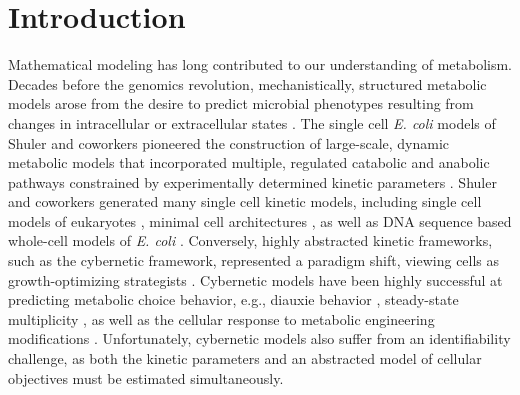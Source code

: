 \documentclass[processes,article,accept,moreauthors,pdftex,12pt,a4paper]{mdpi}
\begin{document}

\section{Introduction}

Mathematical modeling has long contributed to our understanding of metabolism. 
Decades before the genomics revolution, mechanistically, structured metabolic models arose from the desire to predict microbial phenotypes resulting from changes in intracellular or extracellular states \citep{1976_fredrickson_BiotechBioeng}. 
The single cell \textit{E. coli} models of Shuler and coworkers pioneered the construction of large-scale, dynamic metabolic models that incorporated multiple, regulated catabolic and anabolic pathways constrained by experimentally determined kinetic parameters \citep{1984_domach_shuler_BiotechBioeng_01}. 
Shuler and coworkers generated many single cell kinetic models, including single cell models of eukaryotes \citep{1989_steinmeyer_shuler_ChemEngSci,1992_wu_shuler_AnnNYAcadSci}, minimal cell architectures \citep{2004_castellanos_shuler_PNAS}, as well as DNA sequence based whole-cell models of \textit{E. coli} \citep{2008_atlas_shuler_IETSysBio}.
Conversely, highly abstracted kinetic frameworks, such as the cybernetic framework, represented a paradigm shift, viewing cells as growth-optimizing strategists \citep{1985_dhurjati_ramkrishna_tsao_BiotechBioeng}. 
Cybernetic models have been highly successful at predicting metabolic choice behavior, e.g., diauxie behavior \citep{1986_kompala_ramkrishna_tsao_BiotechBioeng}, steady-state multiplicity \citep{2012_kim_ramkrishna_BiotechProg}, as well as the cellular response to metabolic engineering modifications \citep{1999_varner_ramkrishna_MetaEng}. 
Unfortunately, cybernetic models also suffer from an identifiability challenge, as both the kinetic parameters and an abstracted model of cellular objectives must be estimated simultaneously. 
\end{document}
